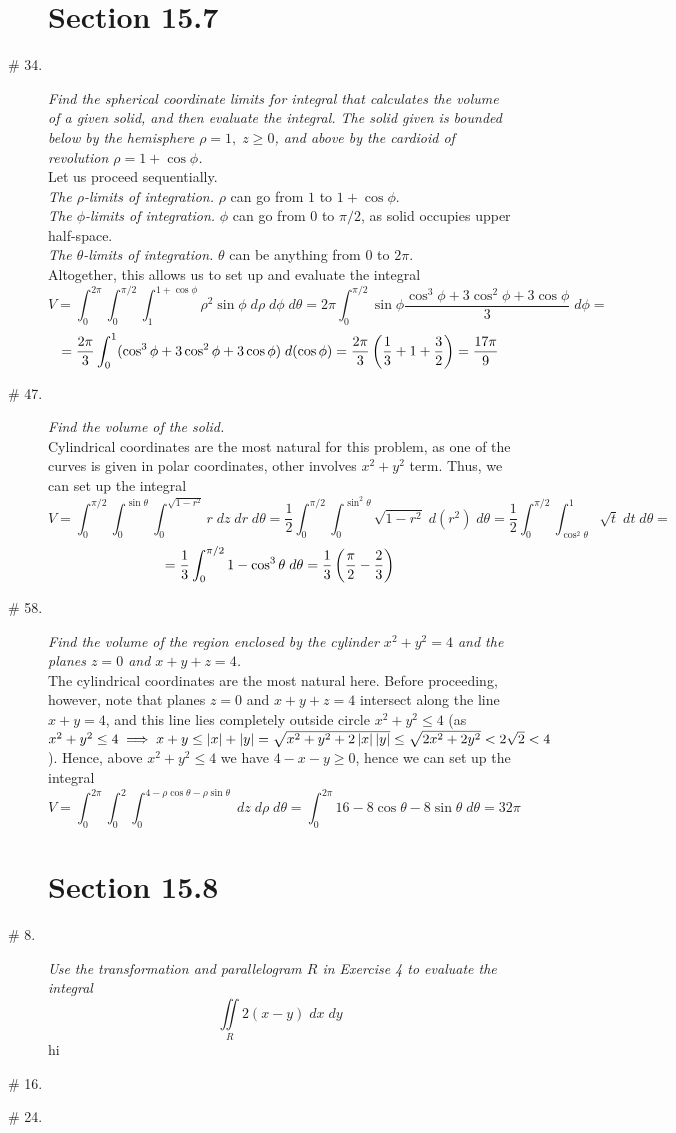 \documentclass[8pt]{article} %
\newcommand{\dx}{\;dx}
\newcommand{\dy}{\;dy}
\newcommand{\dz}{\;dz}
\newcommand{\dr}{\;dr}
\newcommand{\dph}{\;d\phi}
\newcommand{\drh}{\;d\rho}
\newcommand{\dt}{\;d\theta}
\begin{document}
\begin{description}
\section{Section 15.7}
	\item[\# 34.]{{\it Find the spherical coordinate limits for integral that calculates the volume of a given solid, and then
		evaluate the integral. The solid given is bounded below by the hemisphere $\rho=1,\;z\geq0$, and above by the
		cardioid of revolution $\rho=1+\cos\phi$.}\\
		Let us proceed sequentially.\\
		{\it The $\rho$-limits of integration.} $\rho$ can go from $1$ to $1+\cos\phi$.\\
		{\it The $\phi$-limits of integration.} $\phi$ can go from $0$ to $\pi/2$, as solid occupies upper half-space.\\
		{\it The $\theta$-limits of integration.} $\theta$ can be anything from $0$ to $2\pi$.\\
		Altogether, this allows us to set up and evaluate the integral
		\[V=\int_0^{2\pi}\int_0^{\pi/2}\int_1^{1+\cos\phi}\rho^2\sin\phi\drh\dph\dt=2\pi\int_0^{\pi/2}\sin\phi\frac
		{\cos^3\phi+3\cos^2\phi+3\cos\phi}{3}\dph=\]
		\[=\frac{2\pi}{3}\int_0^1(\cos^3\phi+3\cos^2\phi+3\cos\phi)\;d(\cos\phi)=\frac{2\pi}{3}\left(\frac{1}{3}+1+\frac{3}
		{2}\right)=\frac{17\pi}{9}\]
		}
	\item[\# 47.]{{\it Find the volume of the solid.\\}
		Cylindrical coordinates are the most natural for this problem, as one of the curves is given in polar coordinates,
		other involves $x^2+y^2$ term. Thus, we can set up the integral
		\[V=\int_0^{\pi/2}\int_0^{\sin\theta}\int_0^{\sqrt{1-r^2}}r\dz\dr\dt=\frac{1}{2}\int_0^{\pi/2}\int_0^{\sin^2\theta}
		\sqrt{1-r^2}\;d(r^2)\dt=\frac{1}{2}\int_0^{\pi/2}\int_{\cos^2\theta}^1\sqrt t\;dt\dt=\]
		\[=\frac{1}{3}\int_0^{\pi/2}1-\cos^3\theta\dt=\frac{1}{3}\mybra{\frac{\pi}{2}-\frac{2}{3}}\]
		}
	\item[\# 58.]{{\it Find the volume of the region enclosed by the cylinder $x^2+y^2=4$ and the planes $z=0$ and $x+y+z=4$.}\\
		The cylindrical coordinates are the most natural here. Before proceeding, however, note that planes $z=0$
		and $x+y+z=4$ intersect along the line $x+y=4$, and this line lies completely outside circle $x^2+y^2\leq 4$ (as
		$x^2+y^2\leq 4\implies x+y\leq\left|x\right|+\left|y\right|=\sqrt{x^2+y^2+2\left|x\right|\left|y\right|}\leq \sqrt{2x^2+2y^2}<2\sqrt{2}<4$
		). Hence, above $x^2+y^2\leq 4$ we have $4-x-y\geq 0$, hence we can set up the integral
		\[V=\int_0^{2\pi}\int_0^2\int_0^{4-\rho\cos\theta-\rho\sin\theta}\dz\drh\dt=\int_0^{2\pi}16-8\cos\theta-8\sin\theta\dt
		=32\pi\]
		}
\section{Section 15.8}
	\item[\# 8.]{{\it Use the transformation and parallelogram $R$ in Exercise 4 to evaluate the integral}
		\[\iint\limits_R2(x-y)\dx\dy\]
		hi
		}
	\item[\# 16.]{{\it 
		}
		}
	\item[\# 24.]{{\it 
		}
		}
\end{description}
\end{document}
